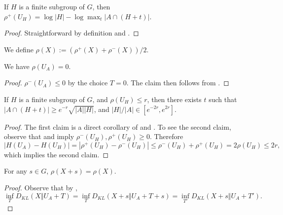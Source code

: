 \begin{corollary}\label{rhoplus-subgroup}\leanok If $H$ is a finite subgroup of $G$, then $\rho^+(U_H) = \log |H| - \log \max_t |A \cap (H+t)|$.
\end{corollary}

\begin{proof}\leanok  Straightforward by definition and .
\end{proof}

\begin{definition}\label{rho-def}\leanok  We define $\rho(X) := (\rho^+(X) + \rho^-(X))/2$.
\end{definition}

\begin{lemma}\label{rho-init}\label{rho_of_uniform}\leanok  We have $\rho(U_A) = 0$.
\end{lemma}

\begin{proof}\leanok  $\rho^-(U_A)\le 0$ by the choice $T=0$. The claim then follows from .
\end{proof}

\begin{lemma}\label{rho-subgroup}\leanok
If $H$ is a finite subgroup of $G$, and $\rho(U_H) \leq r$, then there exists
$t$ such that $|A \cap (H+t)| \geq e^{-r} \sqrt{|A||H|}$, and
$|H|/|A|\in[e^{-2r},e^{2r}]$.
\end{lemma}

\begin{proof}\leanok The first claim is a direct corollary of  and . To see the second claim, observe that  and  imply $\rho^-(U_H),\rho^+(U_H)\ge 0$. Therefore $$|H(U_A)-H(U_H)|=|\rho^+(U_H)-\rho^-(U_H)|\le \rho^-(U_H)+\rho^+(U_H)= 2\rho(U_H)\le 2r,$$
  which implies the second claim.
\end{proof}

\begin{lemma}\label{rho-invariant}\leanok  For any $s \in G$, $\rho(X+s) = \rho(X)$.
\end{lemma}

\begin{proof}\leanok Observe that by , $$\inf_T D_{KL}(X\Vert U_A+T)=\inf_T D_{KL}(X+s\Vert U_A+T+s)=\inf_{T'} D_{KL}(X+s\Vert U_A+T').$$
\end{proof}

